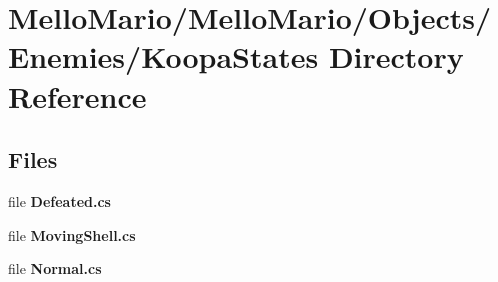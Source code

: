 \section{Mello\+Mario/\+Mello\+Mario/\+Objects/\+Enemies/\+Koopa\+States Directory Reference}
\label{dir_ecae57d8afbdb85ba47d1004b8de5a35}
\subsection*{Files}
\begin{DoxyCompactItemize}
\item 
file \textbf{ Defeated.\+cs}
\item 
file \textbf{ Moving\+Shell.\+cs}
\item 
file \textbf{ Normal.\+cs}
\end{DoxyCompactItemize}

